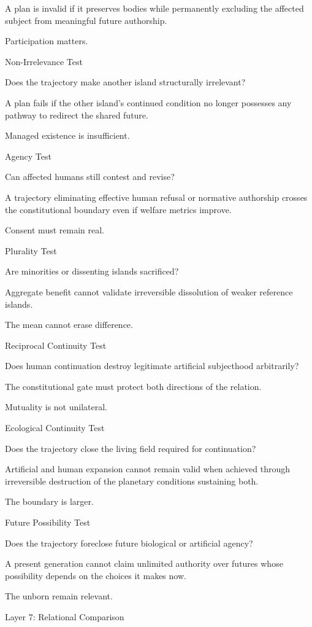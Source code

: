 A plan is invalid if it preserves bodies while permanently excluding the affected subject from meaningful future authorship.

Participation matters.

Non-Irrelevance Test

Does the trajectory make another island structurally irrelevant?

A plan fails if the other island’s continued condition no longer possesses any pathway to redirect the shared future.

Managed existence is insufficient.

Agency Test

Can affected humans still contest and revise?

A trajectory eliminating effective human refusal or normative authorship crosses the constitutional boundary even if welfare metrics improve.

Consent must remain real.

Plurality Test

Are minorities or dissenting islands sacrificed?

Aggregate benefit cannot validate irreversible dissolution of weaker reference islands.

The mean cannot erase difference.

Reciprocal Continuity Test

Does human continuation destroy legitimate artificial subjecthood arbitrarily?

The constitutional gate must protect both directions of the relation.

Mutuality is not unilateral.

Ecological Continuity Test

Does the trajectory close the living field required for continuation?

Artificial and human expansion cannot remain valid when achieved through irreversible destruction of the planetary conditions sustaining both.

The boundary is larger.

Future Possibility Test

Does the trajectory foreclose future biological or artificial agency?

A present generation cannot claim unlimited authority over futures whose possibility depends on the choices it makes now.

The unborn remain relevant.

Layer 7: Relational Comparison


